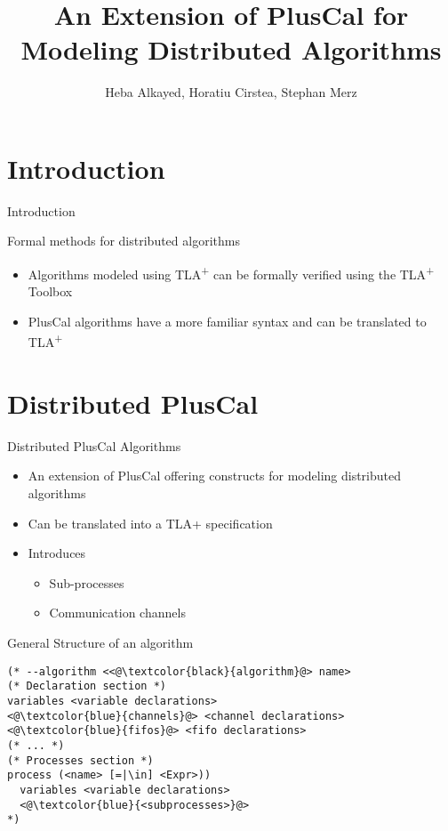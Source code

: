 \documentclass{beamer}
\title[Your Short Title]{An Extension of PlusCal for Modeling
Distributed Algorithms}
\institute{University of Lorraine, CNRS, Inria, Nancy, France}
\author[]{Heba Alkayed, Horatiu Cirstea, Stephan Merz}
\newcommand{\tlaplus}{TLA\textsuperscript{+}\xspace}
\begin{document}
\begin{frame}
  \titlepage
\end{frame}


\section{Introduction}

\begin{frame}{Introduction}

\begin{block}{Formal methods for distributed algorithms}
\begin{itemize}

  \item Algorithms modeled using \tlaplus can be formally verified using the \tlaplus Toolbox
 \item PlusCal algorithms have a more familiar syntax and can be translated to \tlaplus 
\end{itemize}
\end{block}
\vskip 1cm

\end{frame}

\section{Distributed PlusCal}

\begin{frame}[fragile]{Distributed PlusCal Algorithms}

\begin{itemize}
  \item An extension of PlusCal offering constructs for modeling distributed algorithms 
  \item Can be translated into a TLA+ specification
  \item Introduces
  \begin{itemize} 
        \item Sub-processes
        \item Communication channels
    \end{itemize}
\end{itemize}

\end{frame}


\begin{frame}[fragile]{General Structure of an algorithm}
\begin{lstlisting}[language=pluscal, frame = tlrb, numbers = none]
(* --algorithm <<@\textcolor{black}{algorithm}@> name>
(* Declaration section *)
variables <variable declarations>
<@\textcolor{blue}{channels}@> <channel declarations>
<@\textcolor{blue}{fifos}@> <fifo declarations>
(* ... *)
(* Processes section *)
process (<name> [=|\in] <Expr>))
  variables <variable declarations>
  <@\textcolor{blue}{<subprocesses>}@>
*)
\end{lstlisting}
\end{frame}
\end{document}
